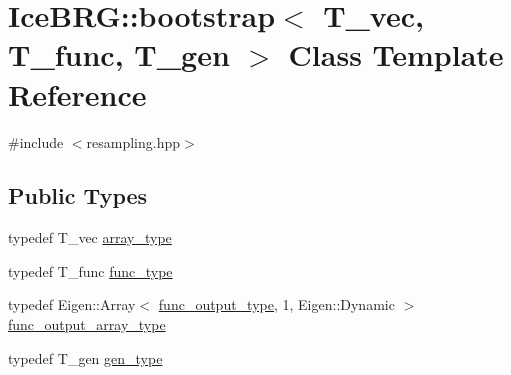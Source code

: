 \hypertarget{classIceBRG_1_1bootstrap}{}\section{Ice\+B\+R\+G\+:\+:bootstrap$<$ T\+\_\+vec, T\+\_\+func, T\+\_\+gen $>$ Class Template Reference}
\label{classIceBRG_1_1bootstrap}


{\ttfamily \#include $<$resampling.\+hpp$>$}

\subsection*{Public Types}
\begin{DoxyCompactItemize}
\item 
typedef T\+\_\+vec \hyperlink{classIceBRG_1_1bootstrap_ad055f31f4e3e35b1cb99ea2f846f2f91}{array\+\_\+type}
\item 
typedef T\+\_\+func \hyperlink{classIceBRG_1_1bootstrap_a4031940b86921fbeb3db1d05a823c7e7}{func\+\_\+type}
\item 
typedef Eigen\+::\+Array$<$ \hyperlink{classIceBRG_1_1bootstrap_a1639d76d292b98b3e4369a944d7bc13b}{func\+\_\+output\+\_\+type}, 1, Eigen\+::\+Dynamic $>$ \hyperlink{classIceBRG_1_1bootstrap_ac0d254f146b5ea54905304d2e54d9cac}{func\+\_\+output\+\_\+array\+\_\+type}
\item 
typedef T\+\_\+gen \hyperlink{classIceBRG_1_1bootstrap_a020ba191b3581f1896c0f4b968f7c5b6}{gen\+\_\+type}
\end{DoxyCompactItemize}

